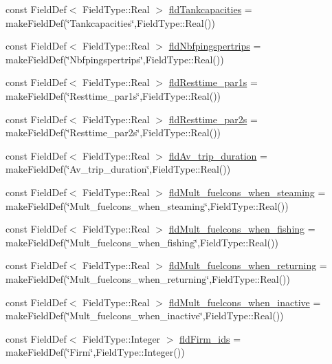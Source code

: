 \begin{DoxyCompactItemize}
\item 
const Field\+Def$<$ Field\+Type\+::\+Real $>$ \mbox{\hyperlink{class_vessel_def_table_aa699fd40e4fb67ca89350cd34c77fe4b}{fld\+Tankcapacities}} = make\+Field\+Def(\char`\"{}Tankcapacities\char`\"{},Field\+Type\+::\+Real())
\item 
const Field\+Def$<$ Field\+Type\+::\+Real $>$ \mbox{\hyperlink{class_vessel_def_table_aa90a3f02e8dce0a41b7cde977d1619e5}{fld\+Nbfpingspertrips}} = make\+Field\+Def(\char`\"{}Nbfpingspertrips\char`\"{},Field\+Type\+::\+Real())
\item 
const Field\+Def$<$ Field\+Type\+::\+Real $>$ \mbox{\hyperlink{class_vessel_def_table_ae22adb79e5172a486bd77b25fe9b7533}{fld\+Resttime\+\_\+par1s}} = make\+Field\+Def(\char`\"{}Resttime\+\_\+par1s\char`\"{},Field\+Type\+::\+Real())
\item 
const Field\+Def$<$ Field\+Type\+::\+Real $>$ \mbox{\hyperlink{class_vessel_def_table_a5a653e96fac17d4c5efe2711daef73c3}{fld\+Resttime\+\_\+par2s}} = make\+Field\+Def(\char`\"{}Resttime\+\_\+par2s\char`\"{},Field\+Type\+::\+Real())
\item 
const Field\+Def$<$ Field\+Type\+::\+Real $>$ \mbox{\hyperlink{class_vessel_def_table_a92834078ff76e4576ff0c9aa957d225f}{fld\+Av\+\_\+trip\+\_\+duration}} = make\+Field\+Def(\char`\"{}Av\+\_\+trip\+\_\+duration\char`\"{},Field\+Type\+::\+Real())
\item 
const Field\+Def$<$ Field\+Type\+::\+Real $>$ \mbox{\hyperlink{class_vessel_def_table_a062621fbd795bb47650695d86fee82b9}{fld\+Mult\+\_\+fuelcons\+\_\+when\+\_\+steaming}} = make\+Field\+Def(\char`\"{}Mult\+\_\+fuelcons\+\_\+when\+\_\+steaming\char`\"{},Field\+Type\+::\+Real())
\item 
const Field\+Def$<$ Field\+Type\+::\+Real $>$ \mbox{\hyperlink{class_vessel_def_table_a78f056421dff23cfc9b70b164ed7e243}{fld\+Mult\+\_\+fuelcons\+\_\+when\+\_\+fishing}} = make\+Field\+Def(\char`\"{}Mult\+\_\+fuelcons\+\_\+when\+\_\+fishing\char`\"{},Field\+Type\+::\+Real())
\item 
const Field\+Def$<$ Field\+Type\+::\+Real $>$ \mbox{\hyperlink{class_vessel_def_table_a6ca37f68050b3b4b4e26637281466637}{fld\+Mult\+\_\+fuelcons\+\_\+when\+\_\+returning}} = make\+Field\+Def(\char`\"{}Mult\+\_\+fuelcons\+\_\+when\+\_\+returning\char`\"{},Field\+Type\+::\+Real())
\item 
const Field\+Def$<$ Field\+Type\+::\+Real $>$ \mbox{\hyperlink{class_vessel_def_table_ab3e2b62fd03a9911b1e7cd37413fafe0}{fld\+Mult\+\_\+fuelcons\+\_\+when\+\_\+inactive}} = make\+Field\+Def(\char`\"{}Mult\+\_\+fuelcons\+\_\+when\+\_\+inactive\char`\"{},Field\+Type\+::\+Real())
\item 
const Field\+Def$<$ Field\+Type\+::\+Integer $>$ \mbox{\hyperlink{class_vessel_def_table_a789bc419a1e80d8e6b7b0d96c2215d90}{fld\+Firm\+\_\+ids}} = make\+Field\+Def(\char`\"{}Firm\char`\"{},Field\+Type\+::\+Integer())
\end{DoxyCompactItemize}


